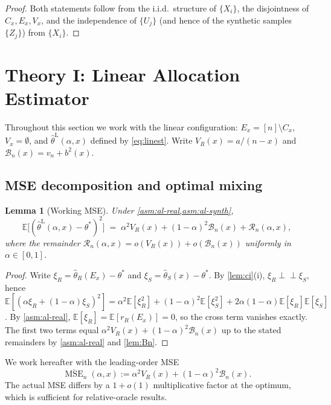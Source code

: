 \documentclass[11pt]{article}
\theoremstyle{plain}
\newtheorem{lemma}[theorem]{Lemma}
\theoremstyle{definition}
\theoremstyle{remark}
\newcommand{\E}{\mathbb{E}}
\newcommand{\MSE}{\operatorname{MSE}}
\newcommand{\indep}{\perp\!\!\!\perp}
\begin{document}
\begin{proof}
Both statements follow from the i.i.d.\ structure of $\{X_i\}$, the disjointness of $C_x,E_x,V_x$, and the independence of $\{U_j\}$ (and hence of the synthetic samples $\{Z_j\}$) from $\{X_i\}$.
\end{proof}

\section{Theory I: Linear Allocation Estimator}
\label{sec:linear}

Throughout this section we work with the linear configuration: $E_x=[n]\setminus C_x$, $V_x=\emptyset$, and $\hat\theta^{\mathrm{L}}(\alpha,x)$ defined by \cref{eq:linest}. Write $V_R(x)=a/(n-x)$ and $\mathcal{B}_n(x)=v_n+b^2(x)$.

\subsection{MSE decomposition and optimal mixing}
\label{ssec:mix}

\begin{lemma}[Working MSE]\label{lem:mse-decomp}
Under \cref{asm:al-real,asm:al-synth},
\begin{equation}\label{eq:mse-decomp}
\E\bigl[(\hat\theta^{\mathrm{L}}(\alpha,x)-\theta^*)^2\bigr]
\;=\;\alpha^2 V_R(x)+(1-\alpha)^2\mathcal{B}_n(x)+\mathcal{R}_n(\alpha,x),
\end{equation}
where the remainder $\mathcal{R}_n(\alpha,x)=o(V_R(x))+o(\mathcal{B}_n(x))$ uniformly in $\alpha\in[0,1]$.
\end{lemma}

\begin{proof}
Write $\xi_R=\hat\theta_R(E_x)-\theta^*$ and $\xi_S=\hat\theta_S(x)-\theta^*$. By \cref{lem:ci}(i), $\xi_R\indep\xi_S$, hence
$\E[(\alpha\xi_R+(1-\alpha)\xi_S)^2]=\alpha^2\E[\xi_R^2]+(1-\alpha)^2\E[\xi_S^2]+2\alpha(1-\alpha)\E[\xi_R]\E[\xi_S]$.
By \cref{asm:al-real}, $\E[\xi_R]=\E[r_R(E_x)]=0$, so the cross term vanishes exactly. The first two terms equal $\alpha^2 V_R(x)+(1-\alpha)^2\mathcal{B}_n(x)$ up to the stated remainders by \cref{asm:al-real} and \cref{lem:Bn}.
\end{proof}

We work hereafter with the leading-order MSE
\begin{equation}\label{eq:mse-bar}
\overline{\MSE}_n(\alpha,x):=\alpha^2 V_R(x)+(1-\alpha)^2\mathcal{B}_n(x).
\end{equation}
The actual MSE differs by a $1+o(1)$ multiplicative factor at the optimum, which is sufficient for relative-oracle results.
\end{document}
